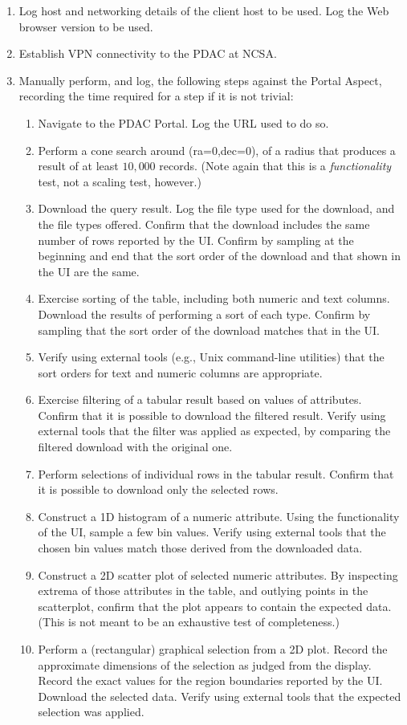 \begin{enumerate}

  \item{Log host and networking details of the client host to be used.
 Log the Web browser version to be used.}
  \item{Establish VPN connectivity to the PDAC at NCSA.}
  \item{Manually perform, and log, the following steps against the Portal Aspect, recording the time required for a step if it is not trivial:
    \begin{enumerate}
      \item{Navigate to the PDAC Portal.  Log the URL used to do so.}
      \item{Perform a cone search around (ra=0,dec=0), of a radius that produces a result of at least $10,000$ records.
 (Note again that this is a \emph{functionality} test, not a scaling test, however.)}
      \item{Download the query result.
 Log the file type used for the download, and the file types offered.
 Confirm that the download includes the same number of rows reported by the UI.
 Confirm by sampling at the beginning and end that the sort order of the download and that shown in the UI are the same.}
      \item{Exercise sorting of the table, including both numeric and text columns.
 Download the results of performing a sort of each type.
 Confirm by sampling that the sort order of the download matches that in the UI.}
      \item{Verify using external tools (e.g., Unix command-line utilities) that the sort orders for text and numeric columns are appropriate.}
      \item{Exercise filtering of a tabular result based on values of attributes.
 Confirm that it is possible to download the filtered result.
 Verify using external tools that the filter was applied as expected, by comparing the filtered download with the original one.}
      \item{Perform selections of individual rows in the tabular result.
 Confirm that it is possible to download only the selected rows.}
      \item{Construct a 1D histogram of a numeric attribute.
 Using the functionality of the UI, sample a few bin values.
 Verify using external tools that the chosen bin values match those derived from the downloaded data.}
      \item{Construct a 2D scatter plot of selected numeric attributes.
 By inspecting extrema of those attributes in the table, and outlying points in the scatterplot, confirm that the plot appears to contain the expected data.
 (This is not meant to be an exhaustive test of completeness.)}
      \item{Perform a (rectangular) graphical selection from a 2D plot.
 Record the approximate dimensions of the selection as judged from the display.
 Record the exact values for the region boundaries reported by the UI.
 Download the selected data.
 Verify using external tools that the expected selection was applied.}
    \end{enumerate}
  }

\end{enumerate}
